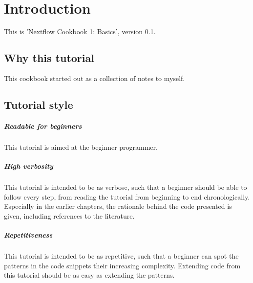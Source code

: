 \chapter{Introduction}

This is 'Nextflow Cookbook 1: Basics', version 0.1.

\section{Why this tutorial}

This cookbook started out as a collection of notes to myself.

\section{Tutorial style}

\paragraph{Readable for beginners}

This tutorial is aimed at the beginner programmer.
 
\paragraph{High verbosity}

This tutorial is intended to be as verbose, 
such that a beginner should
be able to follow every step, 
from reading the tutorial from beginning
to end chronologically.
Especially in the earlier chapters, the rationale behind the code presented
is given, including references to the literature.

\paragraph{Repetitiveness}

This tutorial is intended to be as repetitive, such that a beginner can
spot the patterns in the code snippets their increasing complexity.
Extending code from this tutorial should be as easy as extending the patterns.

